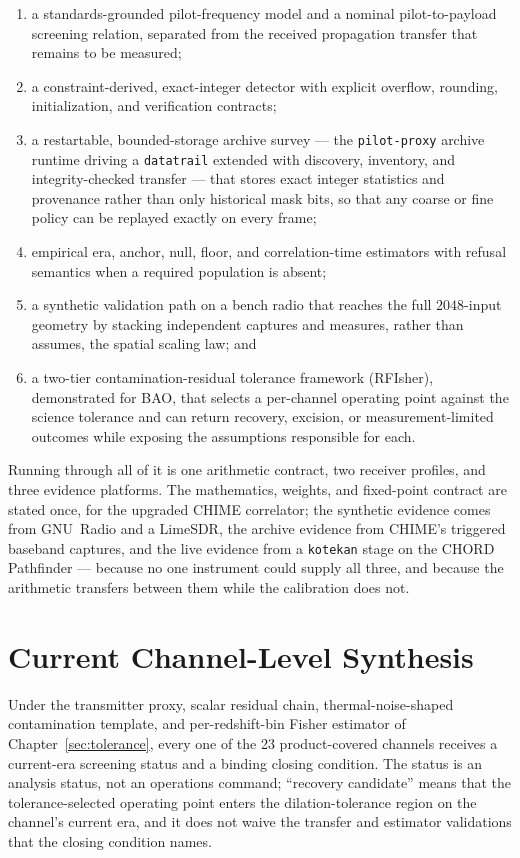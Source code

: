 \begin{enumerate}[leftmargin=2em]
  \item a standards-grounded pilot-frequency model and a nominal
  pilot-to-payload screening relation, separated from the received propagation
  transfer that remains to be measured;
  \item a constraint-derived, exact-integer detector with explicit overflow,
  rounding, initialization, and verification contracts;
  \item a restartable, bounded-storage archive survey --- the
  \texttt{pilot-proxy} archive runtime driving a \texttt{datatrail} extended
  with discovery, inventory, and integrity-checked transfer ---
  that stores exact integer statistics and provenance rather than only
  historical mask bits, so that any coarse or fine policy can be replayed
  exactly on every frame;
  \item empirical era, anchor, null, floor, and correlation-time estimators
  with refusal semantics when a required population is absent;
  \item a synthetic validation path on a bench radio that reaches the full
  $2048$-input geometry by stacking independent captures and measures, rather
  than assumes, the spatial scaling law; and
  \item a two-tier contamination-residual tolerance framework (RFIsher),
  demonstrated for BAO, that selects a per-channel operating point against the
  science tolerance and can return recovery, excision, or measurement-limited
  outcomes while exposing the assumptions responsible for each.
\end{enumerate}

Running through all of it is one arithmetic contract, two receiver profiles, and three evidence platforms.  The
mathematics, weights, and fixed-point contract are stated once, for the
upgraded CHIME correlator; the synthetic evidence comes from GNU~Radio and a
LimeSDR, the archive evidence from CHIME's triggered baseband captures, and
the live evidence from a \texttt{kotekan} stage on the CHORD Pathfinder ---
because no one instrument could supply all three, and because the arithmetic
transfers between them while the calibration does not.

\section{Current Channel-Level Synthesis}
\label{sec:conclusions:matrix}

Under the transmitter proxy, scalar residual chain, thermal-noise-shaped
contamination template, and per-redshift-bin Fisher estimator of
Chapter~\ref{sec:tolerance}, every one of the 23 product-covered channels
receives a current-era screening status and a binding closing condition.  The
status is an analysis status, not an operations command; ``recovery
candidate'' means that the tolerance-selected operating point enters the
dilation-tolerance region on the channel's current era, and it does not waive
the transfer and estimator validations that the closing condition names.


